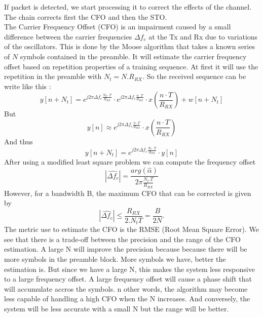 \documentclass{article}
\begin{document}
If packet is detected, we start processing it to correct the effects of the channel. The chain corrects first the CFO and then the STO. \\
The Carrier Frequency Offset (CFO) is an impairment caused by a small difference between the carrier frequencies $\Delta f_c$ at the Tx and Rx due to variations of the oscillators. This is done by the Moose algorithm that takes a known series of $N$ symbols contained in the preamble. It will estimate the carrier frequency offset based on repetition properties of a training sequence. At first it will use the repetition in the preamble with $N_t = N . R_{RX}$.  So the received sequence can be write like this : 
\begin{equation}
    y[n+N_t] = e^{j2\pi \Delta f_c \frac{N_T\cdot T}{R_{RX}}} \cdot e^{j2\pi \Delta f_c \frac{n\cdot T}{R_{RX}}} \cdot x(\frac{n\cdot T}{R_{RX}}) + w[n + N_t]
\end{equation}
But 
\begin{equation}
    y[n] \approx e^{j2\pi \Delta f_c \frac{n\cdot T}{R_{RX}}} \cdot x(\frac{n\cdot T}{R_{RX}})
\end{equation}
And thus 
\begin{equation}
    y[n+N_t] = e^{j2\pi \Delta f_c \frac{N_t\cdot T}{R_{RX}}} \cdot y[n]
\end{equation}
After using a modified least square problem we can compute the frequency offset
\begin{equation}
    |\widehat{\Delta f_c}| = \frac{arg(\hat{\alpha})}{2\pi \frac{N_t . T}{R_{RX}}}
\end{equation}
However, for a bandwidth B, the maximum CFO that can be corrected is given by  \begin{equation*}
    |\widehat{\Delta f_c}| \leq {\frac{R_{RX}}{2.N_t T}} = \frac{B}{2N}.
\end{equation*}
The metric use to estimate the CFO is the RMSE (Root Mean Square Error). 
We see that there is a trade-off between the precision and the range of the CFO estimation. A large N will improve the precision because because there will be more symbols in the preamble block. More symbols we have, better the estimation is. But since we have a large N, this makes the system less responsive to a large frequency offset. A large frequency offset will cause a phase shift that will accumulate accros the symbols. n other words, the algorithm may become less capable of handling a high CFO when the N increases. And conversely, the system will be less accurate with a small N but the range will be better.
\end{document}
